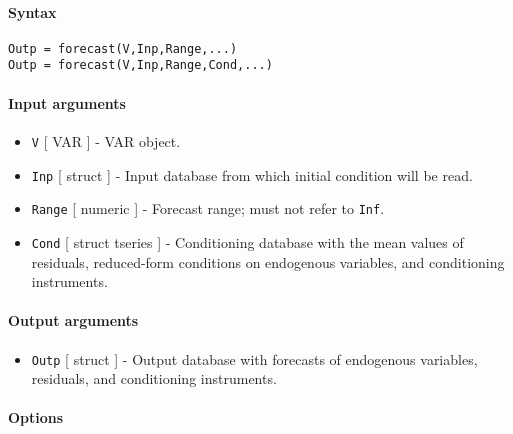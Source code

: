 


	\paragraph{Syntax}

\begin{verbatim}
Outp = forecast(V,Inp,Range,...)
Outp = forecast(V,Inp,Range,Cond,...)
\end{verbatim}

\paragraph{Input arguments}

\begin{itemize}
\item
  \texttt{V} {[} VAR {]} - VAR object.
\item
  \texttt{Inp} {[} struct {]} - Input database from which initial
  condition will be read.
\item
  \texttt{Range} {[} numeric {]} - Forecast range; must not refer to
  \texttt{Inf}.
\item
  \texttt{Cond} {[} struct \textbar{} tseries {]} - Conditioning
  database with the mean values of residuals, reduced-form conditions on
  endogenous variables, and conditioning instruments.
\end{itemize}

\paragraph{Output arguments}

\begin{itemize}
\itemsep1pt\parskip0pt
\item
  \texttt{Outp} {[} struct {]} - Output database with forecasts of
  endogenous variables, residuals, and conditioning instruments.
\end{itemize}

\paragraph{Options}

